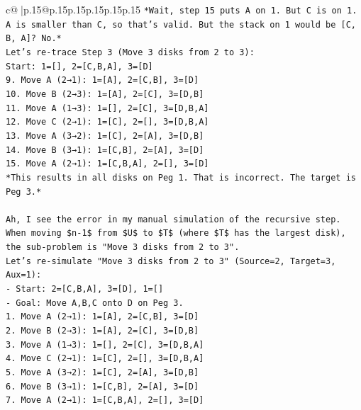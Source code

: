 \documentclass{article}
\begin{document}
{\begin{supertabular}{c@{$\;$}|p{.15\linewidth}@{}p{.15\linewidth}p{.15\linewidth}p{.15\linewidth}p{.15\linewidth}p{.15\linewidth}}
{{{\texttt{*Wait, step 15 puts A on 1. But C is on 1. A is smaller than C, so that's valid. But the stack on 1 would be {[}C, B, A{]}? No.*} \\
\texttt{Let's re{-}trace Step 3 (Move 3 disks from 2 to 3):} \\
\texttt{Start: 1={[}{]}, 2={[}C,B,A{]}, 3={[}D{]}} \\
\texttt{9. Move A (2→1): 1={[}A{]}, 2={[}C,B{]}, 3={[}D{]}} \\
\texttt{10. Move B (2→3): 1={[}A{]}, 2={[}C{]}, 3={[}D,B{]}} \\
\texttt{11. Move A (1→3): 1={[}{]}, 2={[}C{]}, 3={[}D,B,A{]}} \\
\texttt{12. Move C (2→1): 1={[}C{]}, 2={[}{]}, 3={[}D,B,A{]}} \\
\texttt{13. Move A (3→2): 1={[}C{]}, 2={[}A{]}, 3={[}D,B{]}} \\
\texttt{14. Move B (3→1): 1={[}C,B{]}, 2={[}A{]}, 3={[}D{]}} \\
\texttt{15. Move A (2→1): 1={[}C,B,A{]}, 2={[}{]}, 3={[}D{]}} \\
\texttt{*This results in all disks on Peg 1. That is incorrect. The target is Peg 3.*} \\
\\ 
\texttt{Ah, I see the error in my manual simulation of the recursive step.} \\
\texttt{When moving \$n{-}1\$ from \$U\$ to \$T\$ (where \$T\$ has the largest disk), the sub{-}problem is "Move 3 disks from 2 to 3".} \\
\texttt{Let's re{-}simulate "Move 3 disks from 2 to 3" (Source=2, Target=3, Aux=1):} \\
\texttt{{-} Start: 2={[}C,B,A{]}, 3={[}D{]}, 1={[}{]}} \\
\texttt{{-} Goal: Move A,B,C onto D on Peg 3.} \\
\texttt{1. Move A (2→1): 1={[}A{]}, 2={[}C,B{]}, 3={[}D{]}} \\
\texttt{2. Move B (2→3): 1={[}A{]}, 2={[}C{]}, 3={[}D,B{]}} \\
\texttt{3. Move A (1→3): 1={[}{]}, 2={[}C{]}, 3={[}D,B,A{]}} \\
\texttt{4. Move C (2→1): 1={[}C{]}, 2={[}{]}, 3={[}D,B,A{]}} \\
\texttt{5. Move A (3→2): 1={[}C{]}, 2={[}A{]}, 3={[}D,B{]}} \\
\texttt{6. Move B (3→1): 1={[}C,B{]}, 2={[}A{]}, 3={[}D{]}} \\
\texttt{7. Move A (2→1): 1={[}C,B,A{]}, 2={[}{]}, 3={[}D{]}} \\
}}}
\end{supertabular}}
\end{document}
